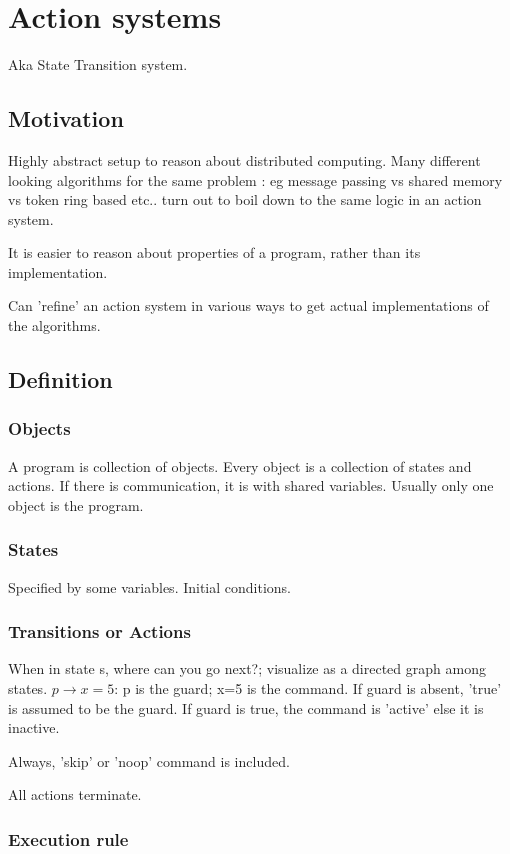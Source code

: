 \documentclass[oneside, article]{memoir}
\begin{document}
\section{Action systems}
Aka State Transition system.

\subsection{Motivation}
Highly abstract setup to reason about distributed computing. Many different looking algorithms for the same problem : eg message passing vs shared memory vs token ring based etc.. turn out to boil down to the same logic in an action system.

It is easier to reason about properties of a program, rather than its implementation.

Can 'refine' an action system in various ways to get actual implementations of the algorithms.

\subsection{Definition}
\subsubsection{Objects}
A program is collection of objects. Every object is a collection of states and actions. If there is communication, it is with shared variables. Usually only one object is the program.

\subsubsection{States}
Specified by some variables. Initial conditions.

\subsubsection{Transitions or Actions}
When in state s, where can you go next?; visualize as a directed graph among states. $p \to x=5$: p is the guard; x=5 is the command. If guard is absent, 'true' is assumed to be the guard. If guard is true, the command is 'active' else it is inactive.

Always, 'skip' or 'noop' command is included.

All actions terminate.

\subsubsection{Execution rule}
\end{document}
